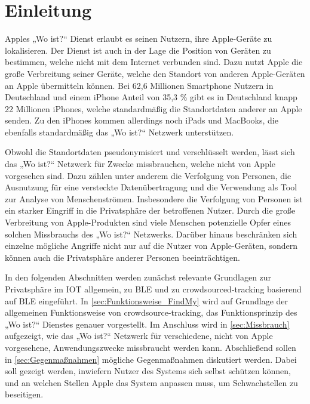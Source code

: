 
\section{Einleitung}

Apples „Wo ist?“ Dienst erlaubt es seinen Nutzern, ihre Apple-Geräte zu lokalisieren.
Der Dienst ist auch in der Lage die Position von Geräten zu bestimmen, welche nicht mit dem Internet verbunden sind.
Dazu nutzt Apple die große Verbreitung seiner Geräte, welche den Standort von anderen Apple-Geräten an Apple übermitteln können.
Bei 62,6 Millionen Smartphone Nutzern in Deutschland \cite{Statista_SmartphonesDeutschland} und einem iPhone Anteil von 35,3 \% \cite{Statscounter_Marktanteil_iOS} gibt es in Deutschland knapp 22 Millionen iPhones, welche standardmäßig die Standortdaten anderer an Apple senden.
Zu den iPhones kommen allerdings noch iPads und MacBooks, die ebenfalls standardmäßig das „Wo ist?“ Netzwerk unterstützen.

Obwohl die Standortdaten pseudonymisiert und verschlüsselt werden, lässt sich das „Wo ist?“ Netzwerk für Zwecke missbrauchen, welche nicht von Apple vorgesehen sind.
Dazu zählen unter anderem die Verfolgung von Personen, die Ausnutzung für eine versteckte Datenübertragung und die Verwendung als Tool zur Analyse von Menschenströmen.
Insbesondere die Verfolgung von Personen ist ein starker Eingriff in die Privatsphäre der betroffenen Nutzer.
Durch die große Verbreitung von Apple-Produkten sind viele Menschen potenzielle Opfer eines solchen Missbrauchs des „Wo ist?“ Netzwerks.
Darüber hinaus beschränken sich einzelne mögliche Angriffe nicht nur auf die Nutzer von Apple-Geräten, sondern können auch die Privatsphäre anderer Personen beeinträchtigen.

In den folgenden Abschnitten werden zunächst relevante Grundlagen zur Privatsphäre im \ac{IOT} allgemein, zu \ac{BLE} und zu crowdsourced-tracking basierend auf \ac{BLE} eingeführt. 
In \autoref{sec:Funktionsweise_FindMy} wird auf Grundlage der allgemeinen Funktionsweise von crowdsource-tracking, das Funktionsprinzip des „Wo ist?“ Dienstes genauer vorgestellt.
Im Anschluss wird in \autoref{sec:Missbrauch} aufgezeigt, wie das „Wo ist?“ Netzwerk für verschiedene, nicht von Apple vorgesehene, Anwendungszwecke missbraucht werden kann.
Abschließend sollen in \autoref{sec:Gegenmaßnahmen} mögliche Gegenmaßnahmen diskutiert werden.
Dabei soll gezeigt werden, inwiefern Nutzer des Systems sich selbst schützen können, und an welchen Stellen Apple das System anpassen muss, um Schwachstellen zu beseitigen.
